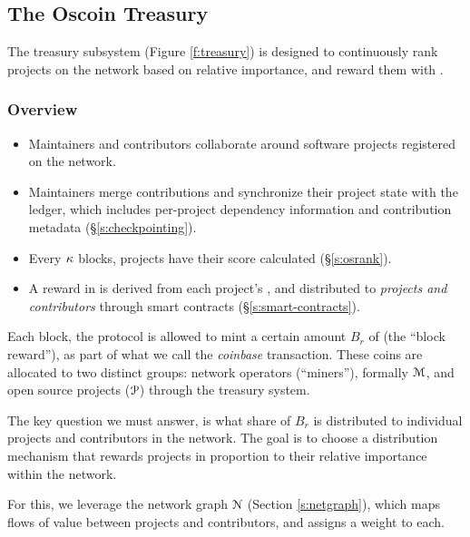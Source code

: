 \subsection{The Oscoin Treasury}
\label{s:treasury}

The treasury subsystem (Figure \ref{f:treasury}) is designed to continuously
rank projects on the network based on relative importance, and reward them with
\oscoin{}.

\subsubsection{Overview}

\begin{itemize}
    \item Maintainers and contributors collaborate around software projects
        registered on the network.
    \item Maintainers merge contributions and synchronize their project state
        with the ledger, which includes per-project dependency information and
        contribution metadata (\S\ref{s:checkpointing}).
    \item Every $\kappa$ blocks, projects have their \osrank{} score calculated
        (\S\ref{s:osrank}).
    \item A reward in \oscoin{} is derived from each project's \osrank{},
        and distributed to \emph{projects and contributors} through smart
        contracts (\S\ref{s:smart-contracts}).
\end{itemize}

\medskip

\noindent Each block, the protocol is allowed to mint a certain amount $B_r$ of \oscoin{}
(the ``block reward''), as part of what we call the \emph{coinbase}
transaction. These coins are allocated to two distinct groups: network
operators (``miners''), formally $\mathcal{M}$, and open source projects ($\mathcal{P}$)
through the treasury system.

The key question we must answer, is what share of $B_r$ is distributed to
individual projects and contributors in the network.  The goal is to choose
a distribution mechanism that rewards projects in proportion to their relative
importance within the network.

For this, we leverage the \oscoin{} network graph $\mathcal{N}$ (Section
\ref{s:netgraph}), which maps flows of value between projects and contributors,
and assigns a weight to each.

